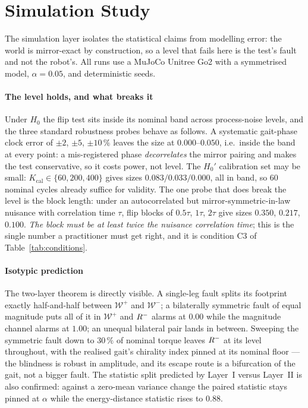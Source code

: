 \section{Simulation Study}
\label{sec:simulation}

The simulation layer isolates the statistical claims from modelling error: the world is mirror-exact by construction, so
a level that fails here is the test's fault and not the robot's. All runs use a MuJoCo Unitree Go2 with a symmetrised
model, $\alpha=0.05$, and deterministic seeds.

\paragraph{The level holds, and what breaks it}
Under $H_0$ the flip test sits inside its nominal band across process-noise levels, and the three standard robustness
probes behave as follows. A systematic gait-phase clock error of $\pm2$, $\pm5$, $\pm10\,\%$ leaves the size at
$0.000$--$0.050$, i.e.\ inside the band at every point: a mis-registered phase \emph{decorrelates} the mirror pairing and
makes the test conservative, so it costs power, not level. The $H_0'$ calibration set may be small: $K_{\mathrm{cal}}\in
\{60,200,400\}$ gives sizes $0.083/0.033/0.000$, all in band, so 60 nominal cycles already suffice for validity. The one
probe that does break the level is the block length: under an autocorrelated but mirror-symmetric-in-law nuisance with
correlation time $\tau$, flip blocks of $0.5\tau$, $1\tau$, $2\tau$ give sizes $0.350$, $0.217$, $0.100$. \emph{The block
must be at least twice the nuisance correlation time}; this is the single number a practitioner must get right, and it
is condition C3 of Table~\ref{tab:conditions}.

\paragraph{Isotypic prediction}
The two-layer theorem is directly visible. A single-leg fault splits its footprint exactly half-and-half between
$\mathcal{W}^+$ and $\mathcal{W}^-$; a bilaterally symmetric fault of equal magnitude puts all of it in $\mathcal{W}^+$
and $R^{-}$ alarms at $0.00$ while the magnitude channel alarms at $1.00$; an unequal bilateral pair lands in between.
Sweeping the symmetric fault down to $30\,\%$ of nominal torque leaves $R^{-}$ at its level throughout, with the
realised gait's chirality index pinned at its nominal floor --- the blindness is robust in amplitude, and its escape
route is a bifurcation of the gait, not a bigger fault. The statistic split predicted by Layer~I versus Layer~II is also
confirmed: against a zero-mean variance change the paired statistic stays pinned at $\alpha$ while the energy-distance
statistic rises to $0.88$.

